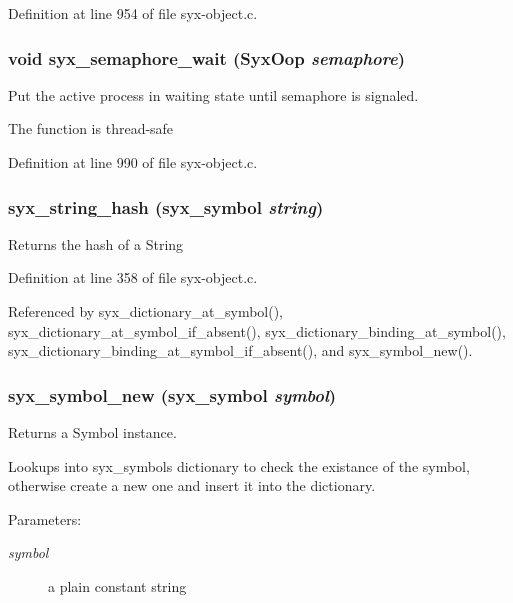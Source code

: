 Definition at line 954 of file syx-object.c.\hypertarget{syx-object_8c_1bfbb9a8a180f9bd9583321dc6925978}{
\subsubsection{\setlength{\rightskip}{0pt plus 5cm}void syx\_\-semaphore\_\-wait ({\bf SyxOop} {\em semaphore})}}
\label{syx-object_8c_1bfbb9a8a180f9bd9583321dc6925978}


Put the active process in waiting state until semaphore is signaled.

The function is thread-safe 

Definition at line 990 of file syx-object.c.\hypertarget{syx-object_8c_5d8630a6cd69dfcb6bb5b50b159a729b}{
\subsubsection{ syx\_\-string\_\-hash ({\bf syx\_\-symbol} {\em string})}}
\label{syx-object_8c_5d8630a6cd69dfcb6bb5b50b159a729b}


Returns the hash of a String 

Definition at line 358 of file syx-object.c.

Referenced by syx\_\-dictionary\_\-at\_\-symbol(), syx\_\-dictionary\_\-at\_\-symbol\_\-if\_\-absent(), syx\_\-dictionary\_\-binding\_\-at\_\-symbol(), syx\_\-dictionary\_\-binding\_\-at\_\-symbol\_\-if\_\-absent(), and syx\_\-symbol\_\-new().\hypertarget{syx-object_8c_6ef910113cd4a2eea7885781a54a2bc7}{
\subsubsection{ syx\_\-symbol\_\-new ({\bf syx\_\-symbol} {\em symbol})}}
\label{syx-object_8c_6ef910113cd4a2eea7885781a54a2bc7}


Returns a Symbol instance.

Lookups into syx\_\-symbols dictionary to check the existance of the symbol, otherwise create a new one and insert it into the dictionary. \begin{Desc}
\item[Parameters:]
\begin{description}
\item[{\em symbol}]a plain constant string \end{description}
\end{Desc}


